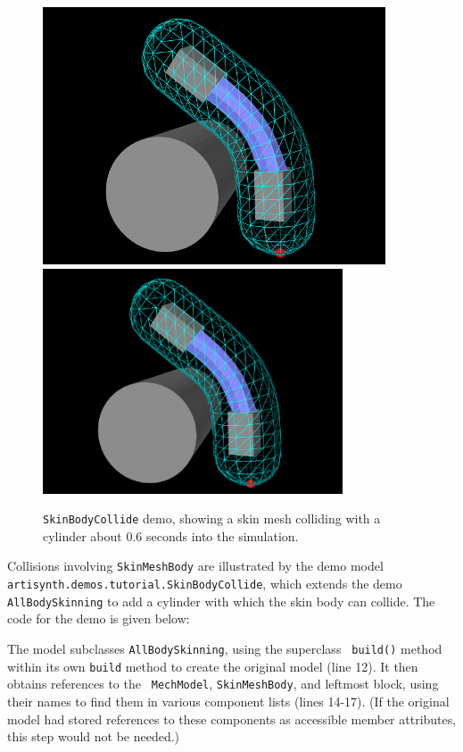\begin{figure}[t]
\begin{center}
\iflatexml
 \includegraphics[]{images/SkinBodyCollide}
\else
 \includegraphics[width=3.5in]{images/SkinBodyCollide}
\fi
\end{center}
\caption{{\tt SkinBodyCollide} demo, showing a skin mesh colliding
with a cylinder about 0.6 seconds into the simulation.}
\label{SkinBodyCollide:fig}
\end{figure}

Collisions involving {\tt SkinMeshBody} are illustrated by the demo
model {\tt artisynth.demos.tutorial.SkinBodyCollide}, which extends
the demo {\tt AllBodySkinning} to add a cylinder with which the skin
body can collide. 
The code for the demo is given below:
\lstset{numbers=left} 

\lstset{numbers=none}

The model subclasses {\tt AllBodySkinning}, using the superclass {\tt
build()} method within its own {\tt build{}} method to create the
original model (line 12). It then obtains references to the {\tt
MechModel}, {\tt SkinMeshBody}, and leftmost block, using their names
to find them in various component lists (lines 14-17).  (If the
original model had stored references to these components as accessible
member attributes, this step would not be needed.)

